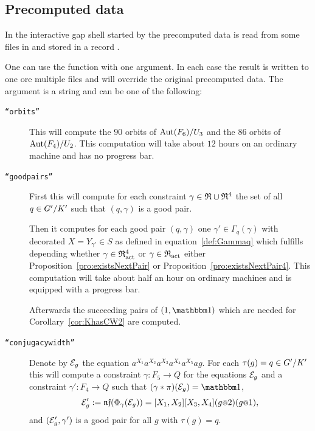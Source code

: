 \documentclass[a4paper,11pt]{amsart}
\begin{document}
\subsection{Precomputed data}\label{sec:precomputation}
In the interactive gap shell started by 
the precomputed data is read from some files in  and stored in 
a record . 

One can use the function  with one argument. In each case
the result is written to one ore multiple files and will override the original precomputed data. 
The argument is a string and can be one of the following:
\begin{description}
    \item [\texttt{``orbits''}] This will compute the $90$ orbits 
    of ${\operatorname{{Aut}}(F_6)/U_3}$ and the
		$86$ orbits of ${\operatorname{{Aut}}(F_4)/U_2}$. This computation will take
		about $12$ hours on an ordinary machine and has no progress bar.
   \item [\texttt{``goodpairs''}] First this will compute for each constraint $\gamma\in\mathfrak{R}\cup\mathfrak{R}^4$ 
		      the set of all $q\in{G'/K'}$ such that $(q,\gamma)$ is a good pair.
		      
		      Then it computes for each good pair $(q,\gamma)$ one $\gamma'\in\Gamma_q(\gamma)$
		      with decorated $X=Y_{\gamma'}\in S$ as defined in equation~\ref{def:Gammaq} which 
		      fulfills depending whether $\gamma\in\mathfrak{R}^4_{\operatorname{act}}$ or $\gamma\in\mathfrak{R}_{\operatorname{act}}$ 
		      either Proposition~\ref{pro:existsNextPair} or Proposition~\ref{pro:existsNextPair4}.
		      This computation will take about half an hour on ordinary machines
           and is equipped with a progress bar. 
		      
		      Afterwards the succeeding pairs of $(1,\id)$ which are 
          needed for Corollary~\ref{cor:KhasCW2} are computed. 
   \item [\texttt{``conjugacywidth''}] Denote by $\mathcal{E}_g$ the equation $a^{X_1}a^{X_2}a^{X_3}a^{X_4}a^{X_5}ag$.
		      For each $\tau(g)=q\in{G'/K'}$ this will compute a constraint 
		      $\gamma\colon F_5 \to Q$ for the equations $\mathcal{E}_g$
		      and a constraint $\gamma'\colon F_4\to Q$ such that
		      $(\gamma * \pi)(\eq{E}_g) = \id$,
		      \[\eq{E}'_g := \nf(\Phi_\gamma(\eq{E}_g))=[X_1,X_2][X_3,X_4](g\at{2})(g\at{1}),\] and
		      $(\mathcal{E}'_g,\gamma')$ is a good pair for all $g$ with $\tau(g)=q$.
		      

\end{description}
\end{document}
